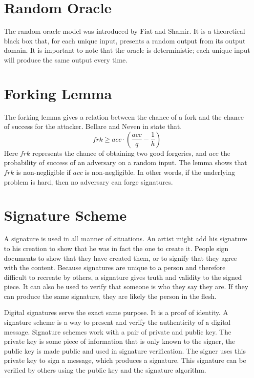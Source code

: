 \section{Random Oracle} \label{Oracle}
The random oracle model \cite{Oracle} was introduced by Fiat and Shamir. It is a theoretical black box that, for each unique input, presents a random output from its output domain. It is important to note that the oracle is deterministic; each unique input will produce the same output every time.

\section{Forking Lemma} \label{Forking}
The forking lemma gives a relation between the chance of a fork and the chance of success for the attacker. Bellare and Neven in \cite{Forking} state that.
\begin{equation*}
frk\ge acc\cdot(\frac{acc}{q}-\frac{1}{h})
\end{equation*}
Here $frk$ represents the chance of obtaining two good forgeries, and $acc$ the probability of success of an adversary on a random input. The lemma shows that $frk$ is non-negligible if $acc$ is non-negligible. In other words, if the underlying problem is hard, then no adversary can forge signatures.

\section{Signature Scheme}
A signature is used in all manner of situations. An artist might add his signature to his creation to show that he was in fact the one to create it. People sign documents to show that they have created them, or to signify that they agree with the content. Because signatures are unique to a person and therefore difficult to recreate by others, a signature gives truth and validity to the signed piece. It can also be used to verify that someone is who they say they are. If they can produce the same signature, they are likely the person in the flesh.

Digital signatures serve the exact same purpose. It is a proof of identity. A signature scheme is a way to present and verify the authenticity of a digital message. Signature schemes work with a pair of private and public key. The private key is some piece of information that is only known to the signer, the public key is made public and used in signature verification. The signer uses this private key to sign a message, which produces a signature. This signature can be verified by others using the public key and the signature algorithm.

